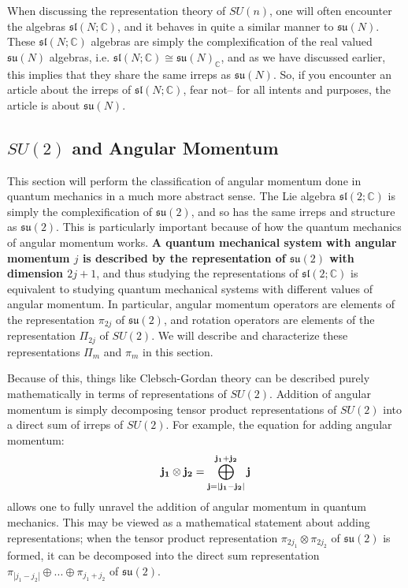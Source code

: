 \documentclass[11pt, oneside]{article}   	%
\theoremstyle{definition}
\begin{document}
When discussing the representation theory of $SU(n)$, one will often encounter the algebras $\mathfrak{sl}(N; 
\mathbb C)$, and it behaves in quite a similar manner to $\mathfrak{su}(N)$. These $\mathfrak{sl}(N; \mathbb C)$ 
algebras are simply the complexification of the real valued $\mathfrak{su}(N)$ algebras, i.e. 
$\mathfrak{sl}(N; \mathbb C)\cong \mathfrak{su}(N)_\mathbb{C}$, and as we have discussed earlier, this implies 
that they share the same irreps as $\mathfrak{su}(N)$. So, if you encounter an article about the irreps of 
$\mathfrak{sl}(N; \mathbb C)$, fear not-- for all intents and purposes, the article is about $\mathfrak{su}(N)$. 

\subsection{$SU(2)$ and Angular Momentum}

This section will perform the classification of angular momentum done in quantum mechanics in a 
much more abstract sense. The Lie algebra $\mathfrak{sl}(2; \mathbb C)$ is simply the complexification 
of $\mathfrak{su}(2)$, and so has the same irreps and structure as $\mathfrak{su}(2)$. This is 
particularly important because of how the quantum mechanics of angular momentum works. \textbf{A 
quantum mechanical system with angular momentum $j$ is described by the representation of 
$\mathfrak{su}(2)$ with dimension $2j + 1$}, and thus studying the representations of $\mathfrak{sl}(2; \mathbb C)$ 
is equivalent to studying quantum mechanical systems with different values of angular momentum. 
In particular, angular momentum operators are elements of the representation $\pi_{2j}$ of $\mathfrak{su}(2)$, 
and rotation operators are elements of the representation $\Pi_{2j}$ of $SU(2)$. We will describe and characterize 
these representations $\Pi_m$ and $\pi_m$ in this section. 

Because of this, things like Clebsch-Gordan theory can be described purely mathematically in terms of representations 
of $SU(2)$. Addition of angular momentum is simply decomposing tensor product representations of $SU(2)$ into a 
direct sum of irreps of $SU(2)$. For example, the equation for adding angular momentum:
\begin{equation}
	\bf{j_1}\otimes j_2 = \bigoplus_{j = |j_1 - j_2|}^{j_1 + j_2} j
\end{equation}
allows one to fully unravel the addition of angular momentum in quantum mechanics. This may be viewed as a mathematical 
statement about adding representations; when the tensor product representation $\pi_{2j_1}\otimes\pi_{2j_2}$ of 
$\mathfrak{su}(2)$ is formed, it can be decomposed into the direct sum representation $\pi_{|j_1 - j_2|}\oplus ...\oplus
\pi_{j_1 + j_2}$ of $\mathfrak{su}(2)$. 
\end{document}
